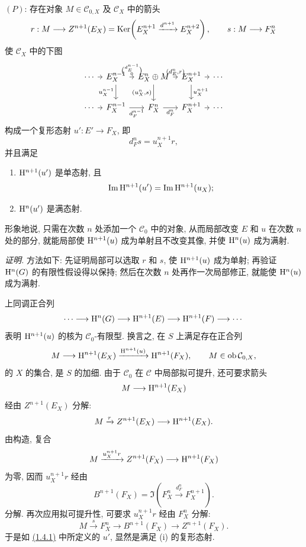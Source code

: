 \((P)\): 存在对象 \(M\in\mathcal C_{0,X}\) 及 \(\mathcal C_X\) 中的箭头
\[
  r:M\longrightarrow Z^{n+1}(E_X)=
  \operatorname{Ker}\!\left(E_X^{n+1}\xrightarrow{d^{n+1}}E_X^{n+2}\right),
  \qquad
  s:M\longrightarrow F_X^n
\]
使 \(\mathcal C_X\) 中的下图
\[
\begin{tikzcd}[column sep=tiny]
\cdots \arrow[r] & E_X^{n-1}
 \arrow[r,"{\binom{d_E^{n-1}}{0}}"]
 \arrow[d,"u_X^{n-1}"'] &
E_X^n\oplus M
 \arrow[r,"{(d_E^n,r)}"]
 \arrow[d,"{(u_X^n,s)}"'] &
E_X^{n+1} \arrow[r] \arrow[d,"u_X^{n+1}"] &
\cdots\\
\cdots \arrow[r] & F_X^{n-1} \arrow[r,"d_F^{n-1}"'] &
F_X^n \arrow[r,"d_F^n"'] &
F_X^{n+1} \arrow[r] &
\cdots
\end{tikzcd}
\]
构成一个复形态射 \(u':E'\to F_X\), 即
\[
  d_F^n s=u_X^{n+1}r,
\]
并且满足
\begin{enumerate}[label=(\roman*)]
\item \(\mathrm H^{n+1}(u')\) 是单态射, 且
\[
  \operatorname{Im}\mathrm H^{n+1}(u')=\operatorname{Im}\mathrm H^{n+1}(u_X);
\]
\item \(\mathrm H^n(u')\) 是满态射.
\end{enumerate}

形象地说, 只需在次数 \(n\) 处添加一个 \(\mathcal C_0\) 中的对象, 从而局部改变 \(E\) 和 \(u\) 在次数 \(n\) 处的部分, 就能局部使 \(\mathrm H^{n+1}(u)\) 成为单射且不改变其像, 并使 \(\mathrm H^n(u)\) 成为满射.

\emph{证明.} 方法如下: 先证明局部可以选取 \(r\) 和 \(s\), 使 \(\mathrm H^{n+1}(u)\) 成为单射; 再验证 \(\mathrm H^n(G)\) 的有限性假设得以保持; 然后在次数 \(n\) 处再作一次局部修正, 就能使 \(\mathrm H^n(u)\) 成为满射.

上同调正合列
\[
  \cdots\longrightarrow \mathrm H^n(G)\longrightarrow
  \mathrm H^{n+1}(E)\longrightarrow
  \mathrm H^{n+1}(F)\longrightarrow \cdots
\]
表明 \(\mathrm H^{n+1}(u)\) 的核为 \(\mathcal C_0\)-有限型. 换言之, 在 \(S\) 上满足存在正合列
\[
  M\longrightarrow \mathrm H^{n+1}(E_X)
  \xrightarrow{\mathrm H^{n+1}(u)}
  \mathrm H^{n+1}(F_X),
  \qquad M\in\operatorname{ob}\mathcal C_{0,X},
\]
的 \(X\) 的集合, 是 \(S\) 的加细. 由于 \(\mathcal C_0\) 在 \(\mathcal C\) 中局部拟可提升, 还可要求箭头
\[
  M\longrightarrow \mathrm H^{n+1}(E_X)
\]
经由 \(Z^{n+1}(E_X)\) 分解:
\[
  M\xrightarrow{r} Z^{n+1}(E_X)\longrightarrow \mathrm H^{n+1}(E_X).
\]
由构造, 复合
\[
  M\xrightarrow{u_X^{n+1}r} Z^{n+1}(F_X)\longrightarrow \mathrm H^{n+1}(F_X)
\]
为零, 因而 \(u_X^{n+1}r\) 经由
\[
  B^{n+1}(F_X)=\Im\!\left(F_X^n\xrightarrow{d_F^n}F_X^{n+1}\right).
\]
分解. 再次应用拟可提升性, 可要求 \(u_X^{n+1}r\) 经由 \(F_X^n\) 分解:
\[
  M\xrightarrow{s}F_X^n\longrightarrow B^{n+1}(F_X)\longrightarrow Z^{n+1}(F_X).
\]
于是如 \hyperlink{sga6.e01.prop.1-4-1}{(1.4.1)} 中所定义的 \(u'\), 显然是满足 (i) 的复形态射.

